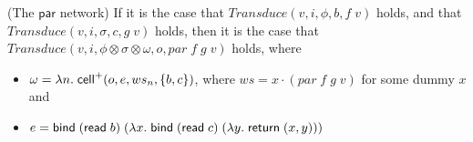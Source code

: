 \begin{lemma}{(The $\mathsf{par}$ network)}
If it is the case that $\mathit{Transduce}(v, i, \phi, b, f\;v)$ holds, and that
$\mathit{Transduce}(v, i, \sigma, c, g\;v)$ holds, then it is the case that
$\mathit{Transduce}(v, i, \phi \otimes \sigma \otimes \omega, o, \mathit{par}\;f\;g\;v)$ holds,
where 

\begin{itemize}
\item $\omega = \lambda n.\;\mathsf{cell}^{+}({o}, {e}, {ws_n}, {\{{b,c}\}})$, where $ws = x \cdot (\mathit{par}\;f\;g\;v)$ for some dummy $x$ and
\item $e = \mathsf{bind}\; (\mathsf{read}\; b)\; (\lambda x.\;\mathsf{bind}\; (\mathsf{read}\; c)\; (\lambda y.\;\mathsf{return}\; (x,y)))$
\end{itemize}
\end{lemma}

